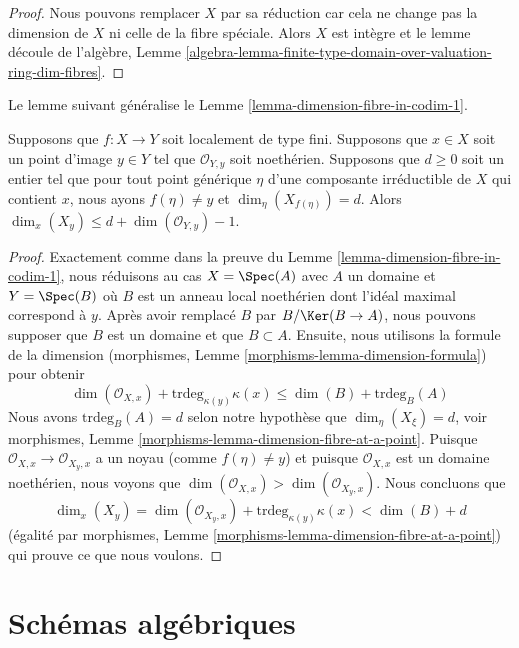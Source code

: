 \begin{proof}
Nous pouvons remplacer $X$ par sa réduction car cela ne change
pas la dimension de $X$ ni celle de la fibre spéciale. Alors
$X$ est intègre et le lemme découle de l'algèbre, Lemme
\ref{algebra-lemma-finite-type-domain-over-valuation-ring-dim-fibres}.
\end{proof}

\noindent
Le lemme suivant généralise le Lemme \ref{lemma-dimension-fibre-in-codim-1}.

\begin{lemma}
\label{lemma-dimension-fibre-in-higher-codimension}
Supposons que $f : X \to Y$ soit localement de type fini. Supposons
que $x \in X$ soit un point d'image $y \in Y$ tel que $\mathcal{O}_{Y,
y}$ soit noethérien. Supposons que $d \geq 0$ soit un entier tel que
pour tout point générique $\eta$ d'une composante irréductible de $X$
qui contient $x$, nous ayons $f(\eta) \not = y$ et
$\dim_\eta(X_{f(\eta)}) = d$. Alors $\dim_x(X_y) \leq d + \dim(\mathcal{O}_{Y, y}) - 1$.
\end{lemma}

\begin{proof}
Exactement comme dans la preuve du Lemme
\ref{lemma-dimension-fibre-in-codim-1}, nous réduisons au cas $X =
\Spec(A)$ avec $A$ un domaine et $Y = \Spec(B)$ où $B$ est un anneau
local noethérien dont l'idéal maximal correspond à $y$. Après avoir
remplacé $B$ par $B/\Ker(B \to A)$, nous pouvons supposer que $B$ est un
domaine et que $B \subset A$. Ensuite, nous utilisons la formule de la
dimension (morphismes, Lemme \ref{morphisms-lemma-dimension-formula}) pour obtenir
$$
\dim(\mathcal{O}_{X, x}) + \text{trdeg}_{\kappa(y)} \kappa(x) \leq
\dim(B) + \text{trdeg}_B(A)
$$
Nous avons $\text{trdeg}_B(A) = d$ selon notre
hypothèse que $\dim_\eta(X_\xi) = d$, voir
morphismes, Lemme
\ref{morphisms-lemma-dimension-fibre-at-a-point}. Puisque
$\mathcal{O}_{X, x} \to \mathcal{O}_{X_y, x}$ a un noyau
(comme $f(\eta) \not = y$) et puisque $\mathcal{O}_{X, x}$
est un domaine noethérien, nous voyons que
$\dim(\mathcal{O}_{X, x}) > \dim(\mathcal{O}_{X_y, x})$. Nous concluons que
$$
\dim_x(X_y) =
\dim(\mathcal{O}_{X_y, x}) + \text{trdeg}_{\kappa(y)} \kappa(x)
< \dim(B) + d
$$
(égalité par morphismes, Lemme
\ref{morphisms-lemma-dimension-fibre-at-a-point}) qui prouve ce que nous voulons.
\end{proof}




\section{Schémas algébriques}
\label{section-algebraic-schemes}

